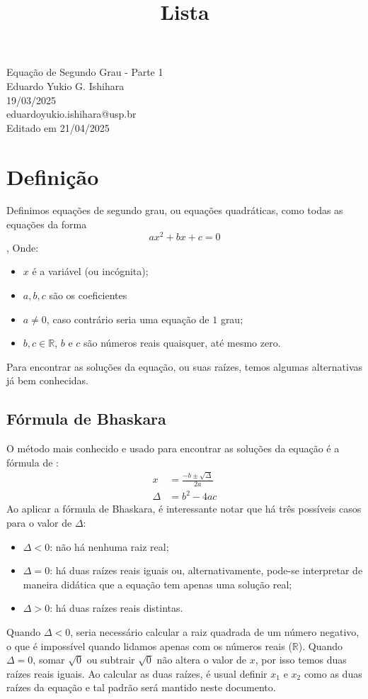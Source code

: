 \documentclass[12pt]{report}
\title{Lista}
\newcommand{\1}{\faThermometerEmpty}
\newcommand{\2}{\faThermometerQuarter}
\newcommand{\3}{\faThermometerHalf}
\newcommand{\4}{\faThermometerThreeQuarters}
\newcommand{\5}{\faThermometerFull}
\begin{document}
\begin{center}
{\Large Equação de Segundo Grau - Parte 1} \\ %
\vspace{1mm}
Eduardo Yukio G. Ishihara \\ 19/03/2025 \\ %
{\footnotesize eduardoyukio.ishihara@usp.br \\
Editado em 21/04/2025} %
\end{center}
\vspace{5mm}

\section*{Definição}
Definimos equações de segundo grau, ou equações quadráticas, como todas as equações da forma
$$ a x^2+bx+c=0$$,
Onde:
\begin{itemize}
    \item $x$ é a variável (ou incógnita);
    \item $a,b,c$ são os coeficientes
    \item $a \neq 0$, caso contrário seria uma equação de $1$\textdegree{} grau;
    \item $b,c \in \mathbb{R}$, $b$ e $c$ são números reais quaisquer, até mesmo zero.
\end{itemize}

Para encontrar as soluções da equação, ou suas raízes, temos algumas alternativas já bem conhecidas.

\subsection*{Fórmula de Bhaskara}
O método mais conhecido e usado para encontrar as soluções da equação é a fórmula de :
$$
\begin{aligned}
    x &= \frac{-b \pm \sqrt{\Delta}}{2a} \\
    \Delta &= b^2-4ac
\end{aligned} $$
Ao aplicar a fórmula de Bhaskara, é interessante notar que há três possíveis casos para o valor de $\Delta$:
\begin{itemize}
    \item $\Delta <0$: não há nenhuma raiz real;
    \item $\Delta = 0$: há duas raízes reais iguais ou, alternativamente, pode-se interpretar de maneira didática que a equação tem apenas uma solução real;
    \item $\Delta >0$: há duas raízes reais distintas.
\end{itemize}
Quando $\Delta<0$, seria necessário calcular a raiz quadrada de um número negativo, o que é impossível quando lidamos apenas com os números reais ($\mathbb{R}$). Quando $\Delta = 0$, somar $\sqrt{0}$ ou subtrair $\sqrt{0}$ não altera o valor de $x$, por isso temos duas raízes reais iguais. Ao calcular as duas raízes, é usual definir $x_1$ e $x_2$ como as duas raízes da equação e tal padrão será mantido neste documento.
\end{document}
